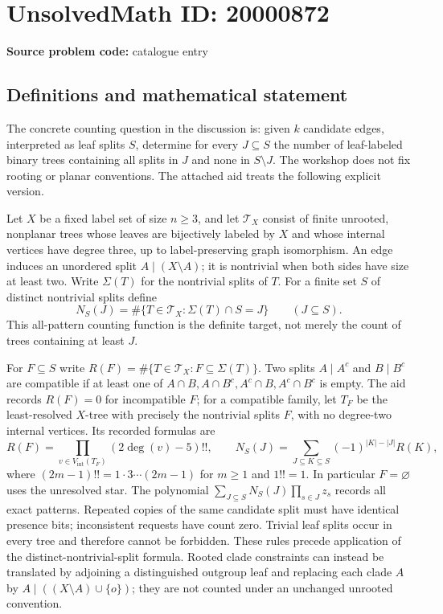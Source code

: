 \documentclass[11pt]{article}
\begin{document}
\section*{UnsolvedMath ID: 20000872}
\textbf{Source problem code:} catalogue entry
\subsection{Definitions and mathematical statement}
The concrete counting question in the discussion is: given $k$ candidate edges, interpreted as leaf splits $S$, determine for every $J\subseteq S$ the number of leaf-labeled binary trees containing all splits in $J$ and none in $S\setminus J$. The workshop does not fix rooting or planar conventions. The attached aid treats the following explicit version.

Let $X$ be a fixed label set of size $n\geq3$, and let $\mathcal T_X$ consist of finite unrooted, nonplanar trees whose leaves are bijectively labeled by $X$ and whose internal vertices have degree three, up to label-preserving graph isomorphism. An edge induces an unordered split $A\mid(X\setminus A)$; it is nontrivial when both sides have size at least two. Write $\Sigma(T)$ for the nontrivial splits of $T$. For a finite set $S$ of distinct nontrivial splits define
\[
 N_S(J)=\#\{T\in\mathcal T_X:\Sigma(T)\cap S=J\}\qquad(J\subseteq S).
\]
This all-pattern counting function is the definite target, not merely the count of trees containing at least $J$.

For $F\subseteq S$ write $R(F)=\#\{T\in\mathcal T_X:F\subseteq\Sigma(T)\}$. Two splits $A\mid A^c$ and $B\mid B^c$ are compatible if at least one of $A\cap B,A\cap B^c,A^c\cap B,A^c\cap B^c$ is empty. The aid records $R(F)=0$ for incompatible $F$; for a compatible family, let $T_F$ be the least-resolved $X$-tree with precisely the nontrivial splits $F$, with no degree-two internal vertices. Its recorded formulas are
\[
 R(F)=\prod_{v\in V_{\mathrm{int}}(T_F)}(2\deg(v)-5)!!,\qquad
 N_S(J)=\sum_{J\subseteq K\subseteq S}(-1)^{|K|-|J|}R(K),
\]
where $(2m-1)!!=1\cdot3\cdots(2m-1)$ for $m\geq1$ and $1!!=1$. In particular $F=\varnothing$ uses the unresolved star. The polynomial $\sum_{J\subseteq S}N_S(J)\prod_{s\in J}z_s$ records all exact patterns. Repeated copies of the same candidate split must have identical presence bits; inconsistent requests have count zero. Trivial leaf splits occur in every tree and therefore cannot be forbidden. These rules precede application of the distinct-nontrivial-split formula. Rooted clade constraints can instead be translated by adjoining a distinguished outgroup leaf and replacing each clade $A$ by $A\mid((X\setminus A)\cup\{o\})$; they are not counted under an unchanged unrooted convention.
\end{document}
